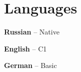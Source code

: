 \documentclass[11pt,a4paper]{moderncv}
\begin{document}
\section{Languages}
{\begin{multicols}{3}
\textbf{Russian} -- Native

\textbf{English} -- C1

\textbf{German} -- Basic

\end{multicols}
}
\end{document}
